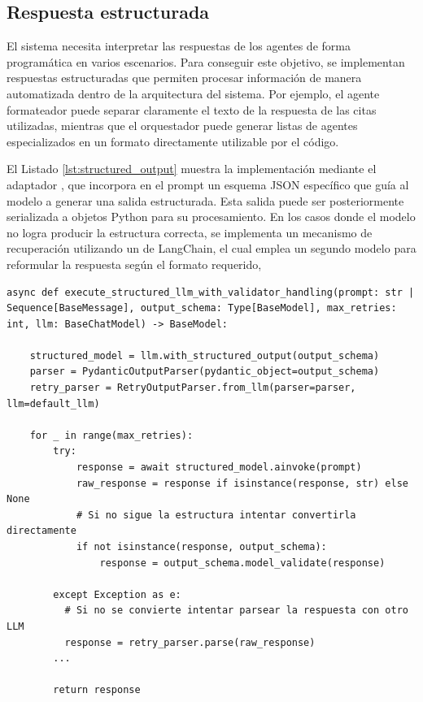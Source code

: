 \subsection{Respuesta estructurada}
El sistema necesita interpretar las respuestas de los agentes de forma programática en varios escenarios. Para conseguir este objetivo, se implementan respuestas estructuradas que permiten procesar información de manera automatizada dentro de la arquitectura del sistema. Por ejemplo, el agente formateador puede separar claramente el texto de la respuesta de las citas utilizadas, mientras que el orquestador puede generar listas de agentes especializados en un formato directamente utilizable por el código.

El Listado \ref{lst:structured_output} muestra la implementación mediante el adaptador , que incorpora en el prompt un esquema JSON específico que guía al modelo a generar una salida estructurada. Esta salida puede ser posteriormente serializada a objetos Python para su procesamiento. En los casos donde el modelo no logra producir la estructura correcta, se implementa un mecanismo de recuperación utilizando un  de LangChain, el cual emplea un segundo modelo para reformular la respuesta según el formato requerido,



\begin{lstlisting}[caption={Validación de la salida estructurada de un LLM},label={lst:structured_output}]
  async def execute_structured_llm_with_validator_handling(prompt: str | Sequence[BaseMessage], output_schema: Type[BaseModel], max_retries: int, llm: BaseChatModel) -> BaseModel:

    structured_model = llm.with_structured_output(output_schema)
    parser = PydanticOutputParser(pydantic_object=output_schema)
    retry_parser = RetryOutputParser.from_llm(parser=parser, llm=default_llm)

    for _ in range(max_retries):
        try:
            response = await structured_model.ainvoke(prompt)
            raw_response = response if isinstance(response, str) else None
            # Si no sigue la estructura intentar convertirla directamente 
            if not isinstance(response, output_schema):
                response = output_schema.model_validate(response)

        except Exception as e:
          # Si no se convierte intentar parsear la respuesta con otro LLM  
          response = retry_parser.parse(raw_response)
        ...

        return response
\end{lstlisting}
